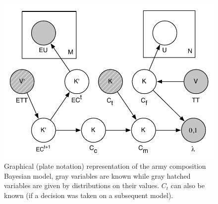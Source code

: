 \begin{figure}[htp]
\centerline{\includegraphics[width=0.55\columnwidth]{images/army_composition_model.pdf}}
\caption{Graphical (plate notation) representation of the army composition Bayesian model, gray variables are known while gray hatched variables are given by distributions on their values. $C_t$ can also be known (if a decision was taken on a subsequent model).}
\label{BN}
\end{figure}

